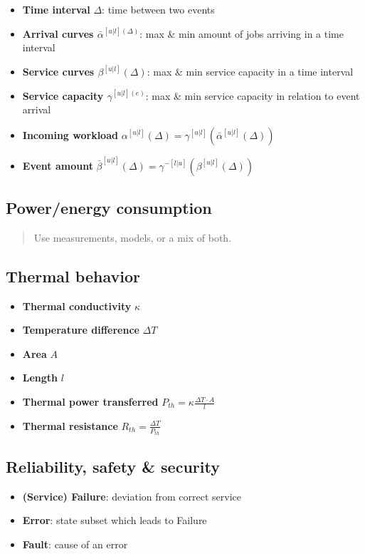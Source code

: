 \documentclass{article}
\begin{document}
\begin{itemize}
  \item \textbf{Time interval} $\Delta$: time between two events
  \item \textbf{Arrival curves $\bar{\alpha}^{[u|l](\Delta)}$}: max \& min amount of jobs arriving in a time interval
  \item \textbf{Service curves $\beta^{[u|l]}(\Delta)$}: max \& min service capacity in a time interval
  \item \textbf{Service capacity $\gamma^{[u|l](e)}$}: max \& min service capacity in relation to event arrival
  \item \textbf{Incoming workload} $\alpha^{[u|l]}(\Delta)=\gamma^{[u|l]}(\bar{\alpha}^{[u|l]}(\Delta))$
  \item \textbf{Event amount} $\bar{\beta}^{[u|l]}(\Delta)=\gamma^{-[l|u]}(\beta^{[u|l]}(\Delta))$
\end{itemize}

\subsection{Power/energy consumption}
\begin{quote}Use measurements, models, or a mix of both.\end{quote}

\subsection{Thermal behavior}
\begin{itemize}
  \item \textbf{Thermal conductivity} $\kappa$
  \item \textbf{Temperature difference} $\Delta T$
  \item \textbf{Area} $A$
  \item \textbf{Length} $l$
  \item \textbf{Thermal power transferred} $P_{th}=\kappa \frac{\Delta T \cdot A}{l}$
  \item \textbf{Thermal resistance} $R_{th}=\frac{\Delta T}{P_{th}}$
\end{itemize}

\subsection{Reliability, safety \& security}
\begin{itemize}
  \item \textbf{(Service) Failure}: deviation from correct service
  \item \textbf{Error}: state subset which leads to Failure
  \item \textbf{Fault}: cause of an error
\end{itemize}
\end{document}
